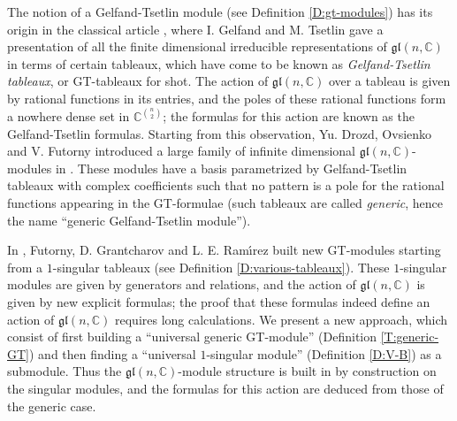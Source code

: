 \documentclass[11pt,fleqn]{article}
\newcounter{para}[section]
\newcommand\CC{\mathbb C}
\newcommand\gl{\mathfrak{gl}}
\begin{document}
The notion of a Gelfand-Tsetlin module (see Definition \ref{D:gt-modules}) has 
its origin in the classical article \cite{GT-modules}, where I. Gelfand and M. 
Tsetlin gave a presentation of all the finite dimensional irreducible 
representations of $\gl(n,\CC)$ in terms of certain tableaux, which have come 
to be known as \emph{Gelfand-Tsetlin tableaux}, or GT-tableaux for shot. The 
action of $\gl(n,\CC)$ over a tableau is given by rational functions in its
entries, and the poles of these rational functions form a nowhere dense set
in $\CC^{\binom{n}{2}}$; the formulas for this action are known as the 
Gelfand-Tsetlin formulas. Starting from this observation, Yu. Drozd, Ovsienko 
and V. Futorny introduced a large family of infinite dimensional 
$\gl(n,\CC)$-modules in \cite{DFO-GT-modules}. These modules have a basis 
parametrized by Gelfand-Tsetlin tableaux with complex coefficients such that 
no pattern is a pole for the rational functions appearing in the GT-formulae 
(such tableaux are called \emph{generic}, hence the name ``generic 
Gelfand-Tsetlin module''). 

In \cite{FGR-singular-gt}, Futorny, D. Grantcharov and L. E. Ram\'\i rez built 
new GT-modules starting from a $1$-singular tableaux (see Definition 
\ref{D:various-tableaux}). These $1$-singular modules are given by generators
and relations, and the action of $\gl(n,\CC)$ is given by new explicit 
formulas; the proof that these formulas indeed define an action of $\gl(n,\CC)$
requires long calculations. We present a new approach, which consist of first
building a ``universal generic GT-module'' (Definition \ref{T:generic-GT})
and then finding a ``universal $1$-singular module'' (Definition \ref{D:V-B})
as a submodule. Thus the $\gl(n,\CC)$-module structure is built in by 
construction on the singular modules, and the formulas for this action are
deduced from those of the generic case. 
\end{document}
